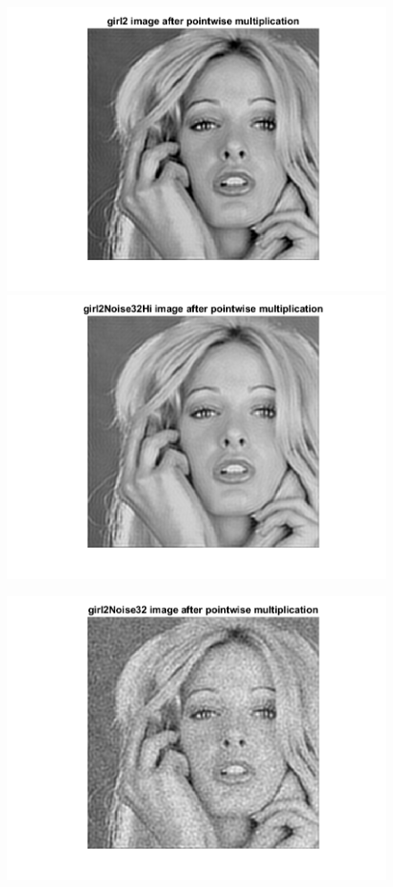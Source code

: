 \documentclass[11pt]{article} %
\begin{document}
\begin{figure}
 \centering
	\includegraphics{2be.png}
	\includegraphics{2bf.png}
\end{figure}
\begin{figure}
 \centering
	\includegraphics{2bg.png}
\end{figure}
\clearpage 
\end{document}
